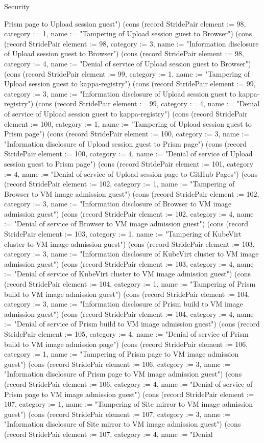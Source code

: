 \begin{lexlean}{Security}
\begin{semanticmodule}
{Prism page to Upload session guest"}) (cons (record StridePair {element := 98, category := 1, name := "Tampering of Upload session guest to Browser"}) (cons (record StridePair {element := 98, category := 3, name := "Information disclosure of Upload session guest to Browser"}) (cons (record StridePair {element := 98, category := 4, name := "Denial of service of Upload session guest to Browser"}) (cons (record StridePair {element := 99, category := 1, name := "Tampering of Upload session guest to kappa-registry"}) (cons (record StridePair {element := 99, category := 3, name := "Information disclosure of Upload session guest to kappa-registry"}) (cons (record StridePair {element := 99, category := 4, name := "Denial of service of Upload session guest to kappa-registry"}) (cons (record StridePair {element := 100, category := 1, name := "Tampering of Upload session guest to Prism page"}) (cons (record StridePair {element := 100, category := 3, name := "Information disclosure of Upload session guest to Prism page"}) (cons (record StridePair {element := 100, category := 4, name := "Denial of service of Upload session guest to Prism page"}) (cons (record StridePair {element := 101, category := 4, name := "Denial of service of Upload session page to GitHub Pages"}) (cons (record StridePair {element := 102, category := 1, name := "Tampering of Browser to VM image admission guest"}) (cons (record StridePair {element := 102, category := 3, name := "Information disclosure of Browser to VM image admission guest"}) (cons (record StridePair {element := 102, category := 4, name := "Denial of service of Browser to VM image admission guest"}) (cons (record StridePair {element := 103, category := 1, name := "Tampering of KubeVirt cluster to VM image admission guest"}) (cons (record StridePair {element := 103, category := 3, name := "Information disclosure of KubeVirt cluster to VM image admission guest"}) (cons (record StridePair {element := 103, category := 4, name := "Denial of service of KubeVirt cluster to VM image admission guest"}) (cons (record StridePair {element := 104, category := 1, name := "Tampering of Prism build to VM image admission guest"}) (cons (record StridePair {element := 104, category := 3, name := "Information disclosure of Prism build to VM image admission guest"}) (cons (record StridePair {element := 104, category := 4, name := "Denial of service of Prism build to VM image admission guest"}) (cons (record StridePair {element := 105, category := 4, name := "Denial of service of Prism build to VM image admission page"}) (cons (record StridePair {element := 106, category := 1, name := "Tampering of Prism page to VM image admission guest"}) (cons (record StridePair {element := 106, category := 3, name := "Information disclosure of Prism page to VM image admission guest"}) (cons (record StridePair {element := 106, category := 4, name := "Denial of service of Prism page to VM image admission guest"}) (cons (record StridePair {element := 107, category := 1, name := "Tampering of Site mirror to VM image admission guest"}) (cons (record StridePair {element := 107, category := 3, name := "Information disclosure of Site mirror to VM image admission guest"}) (cons (record StridePair {element := 107, category := 4, name := "Denial }
\end{semanticmodule}
\end{lexlean}
